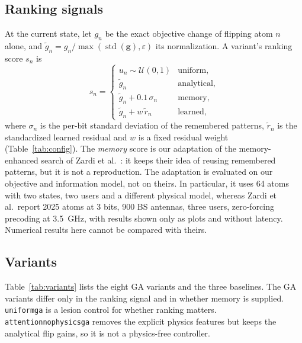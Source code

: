 \documentclass[conference]{IEEEtran}
\newcommand{\mth}[1]{\begingroup\renewcommand{\_}{\textunderscore\allowbreak}\texttt{#1}\endgroup}
\begin{document}
\subsection{Ranking signals}
At the current state, let $g_n$ be the exact objective change of flipping atom $n$ alone, and $\tilde g_n=g_n/\max(\operatorname{std}(\mathbf g),\varepsilon)$ its normalization. A variant's ranking score $s_n$ is
\begin{equation}
s_n=\begin{cases}
u_n\sim\mathcal U(0,1) & \text{uniform},\\
\tilde g_n & \text{analytical},\\
\tilde g_n+0.1\,\sigma_n & \text{memory},\\
\tilde g_n+w\,\tilde r_n & \text{learned},
\end{cases}\label{eq:rank}
\end{equation}
where $\sigma_n$ is the per-bit standard deviation of the remembered patterns, $\tilde r_n$ is the standardized learned residual and $w$ is a fixed residual weight (Table~\ref{tab:config}). The \emph{memory} score is our adaptation of the memory-enhanced search of Zardi et al.~\cite{zardi}: it keeps their idea of reusing remembered patterns, but it is not a reproduction. The adaptation is evaluated on our objective and information model, not on theirs. In particular, it uses 64 atoms with two states, two users and a different physical model, whereas Zardi et al.\ report 2025 atoms at 3 bits, 900 BS antennas, three users, zero-forcing precoding at 3.5~GHz, with results shown only as plots and without latency. Numerical results here cannot be compared with theirs.

\subsection{Variants}
Table~\ref{tab:variants} lists the eight GA variants and the three baselines. The GA variants differ only in the ranking signal and in whether memory is supplied. \mth{uniform\_ga} is a lesion control for whether ranking matters. \mth{attention\_no\_physics\_ga} removes the explicit physics features but keeps the analytical flip gains, so it is not a physics-free controller.
\end{document}
